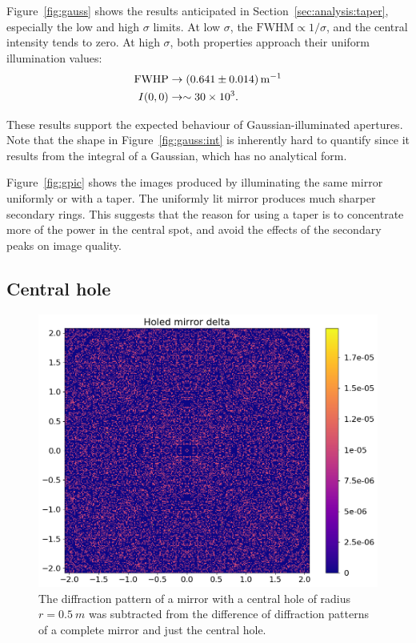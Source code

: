 \documentclass[11pt]{article}
\newcommand{\R}[1]{\mathrm{#1}}
\begin{document}
Figure~\ref{fig:gauss} shows the results anticipated in Section~\ref{sec:analysis:taper}, especially the low and high $\sigma$ limits. At low $\sigma$, the $\R{FWHM} \propto 1/\sigma$, and the central intensity tends to zero. At high $\sigma$, both properties approach their uniform illumination values:
\begin{align*}
    \R{FWHP} &\rightarrow \SI{0.641 \pm 0.014}{\per\metre} \\
    I(0, 0) &\rightarrow \sim \num{30e3}.
\end{align*}

These results support the expected behaviour of Gaussian-illuminated apertures. Note that the shape in Figure~\ref{fig:gauss:int} is inherently hard to quantify since it results from the integral of a Gaussian, which has no analytical form.

Figure~\ref{fig:gpic} shows the images produced by illuminating the same mirror uniformly or with a taper. The uniformly lit mirror produces much sharper secondary rings. This suggests that the reason for using a taper is to concentrate more of the power in the central spot, and avoid the effects of the secondary peaks on image quality.

\subsection{Central hole}\label{sec:res:hole}
\begin{figure}
    \centering
    \begin{minipage}{0.6\textwidth}
        \centering
        \includegraphics[width=\textwidth]{pictures/hole/delta2.png}
    \end{minipage}%
    \hfill
    \begin{minipage}{0.37\textwidth}
        \caption{The diffraction pattern of a mirror with a central hole of radius $r=\SI{0.5}{m}$ was subtracted from the difference of diffraction patterns of a complete mirror and just the central hole.}\label{fig:hole}
    \end{minipage}
\end{figure}
\end{document}
